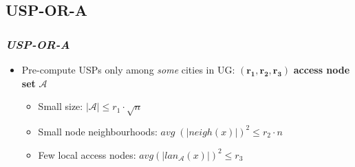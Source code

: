 \documentclass[]{beamer}
\newcommand{\inputTikZ}[1]{%
  }
\newcommand{\inputTikZ}[1]{%
    \beginpgfgraphicnamed{#1-external}%
    \endpgfgraphicnamed%
  }
\begin{document}
        \subsection{USP-OR-A}
        \begin{frame}
            \frametitle{\textit{USP-OR-A}}
		    \footnotesize
			\begin{itemize}
				\item Pre-compute USPs only among \textit{some} cities in UG: $\bm{(r_{1}, r_{2}, r_{3})}$ \textbf{access node set} $\mathcal{A}$
				\begin{itemize}
					\footnotesize
					\item Small size: $|\mathcal{A}| \leq r_{1} \cdot \sqrt{n}$
					\item Small node neighbourhoods: $avg \; (|neigh(x)|)^{2} \leq r_{2} \cdot n$
					\item Few local access nodes: $avg (|lan_{\mathcal{A}}(x)|)^{2} \leq r_{3}$
				\end{itemize}
	        \end{itemize}
	        \vspace{-0.35cm}
	        \makebox[\linewidth]{\parbox{12cm}{\begin{figure}[h]
				\scriptsize
                \begin{center}
					\inputTikZ{./tikzpics/uspora}
                \end{center}
            \end{figure}
            }}
        \end{frame} 
        
\end{document}
